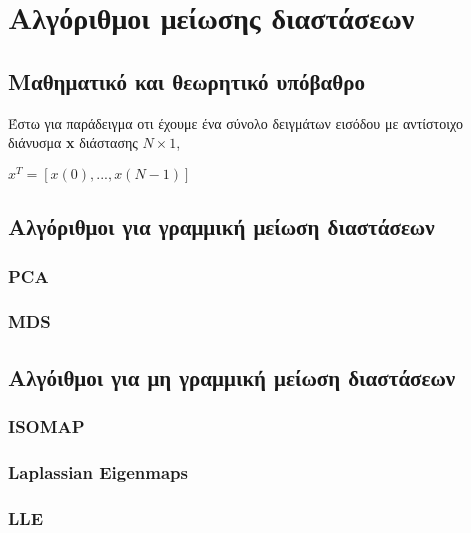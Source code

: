 

\chapter{Αλγόριθμοι μείωσης διαστάσεων}

\section{Μαθηματικό και θεωρητικό υπόβαθρο}
\par
Έστω για παράδειγμα οτι έχουμε ένα σύνολο δειγμάτων εισόδου με αντίστοιχο διάνυσμα \textlatin{\textbf{x}} διάστασης $N\times1$,
\vspace*{0.1mm}
\begin{center}
$x^{T} = [x(0),...,x(N-1)]$
\end{center}

\section{Αλγόριθμοι για γραμμική μείωση διαστάσεων}
\subsection{\textlatin{PCA}}
\subsection{\textlatin{MDS}}

\section{Αλγόιθμοι για μη γραμμική μείωση διαστάσεων}
\subsection{\textlatin{ISOMAP}}
\subsection{\textlatin{Laplassian Eigenmaps}}
\subsection{\textlatin{LLE}}
